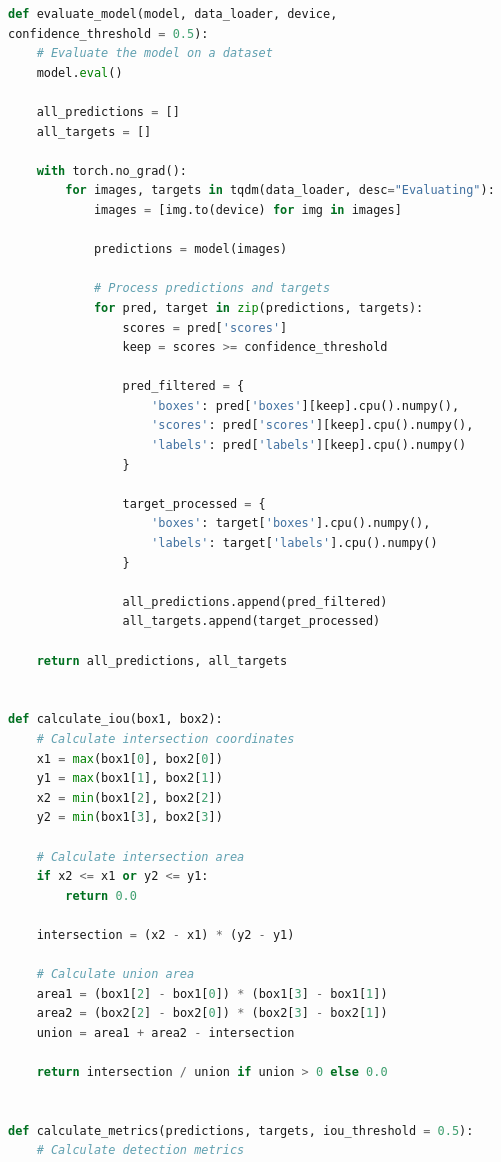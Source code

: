 \documentclass[12pt]{article}
\begin{document}
\begin{lstlisting}[language=Python, caption={Esempio di codice per la validazione del modello Resnet}, label={lst:valid-resnet}]
def evaluate_model(model, data_loader, device, 
confidence_threshold = 0.5):
    # Evaluate the model on a dataset
    model.eval()
    
    all_predictions = []
    all_targets = []
    
    with torch.no_grad():
        for images, targets in tqdm(data_loader, desc="Evaluating"):
            images = [img.to(device) for img in images]
            
            predictions = model(images)
            
            # Process predictions and targets
            for pred, target in zip(predictions, targets):
                scores = pred['scores']
                keep = scores >= confidence_threshold
                
                pred_filtered = {
                    'boxes': pred['boxes'][keep].cpu().numpy(),
                    'scores': pred['scores'][keep].cpu().numpy(),
                    'labels': pred['labels'][keep].cpu().numpy()
                }
                
                target_processed = {
                    'boxes': target['boxes'].cpu().numpy(),
                    'labels': target['labels'].cpu().numpy()
                }
                
                all_predictions.append(pred_filtered)
                all_targets.append(target_processed)
    
    return all_predictions, all_targets


def calculate_iou(box1, box2):
    # Calculate intersection coordinates
    x1 = max(box1[0], box2[0])
    y1 = max(box1[1], box2[1])
    x2 = min(box1[2], box2[2])
    y2 = min(box1[3], box2[3])
    
    # Calculate intersection area
    if x2 <= x1 or y2 <= y1:
        return 0.0
    
    intersection = (x2 - x1) * (y2 - y1)
    
    # Calculate union area
    area1 = (box1[2] - box1[0]) * (box1[3] - box1[1])
    area2 = (box2[2] - box2[0]) * (box2[3] - box2[1])
    union = area1 + area2 - intersection
    
    return intersection / union if union > 0 else 0.0


def calculate_metrics(predictions, targets, iou_threshold = 0.5):
    # Calculate detection metrics
    

\end{lstlisting}
\end{document}
